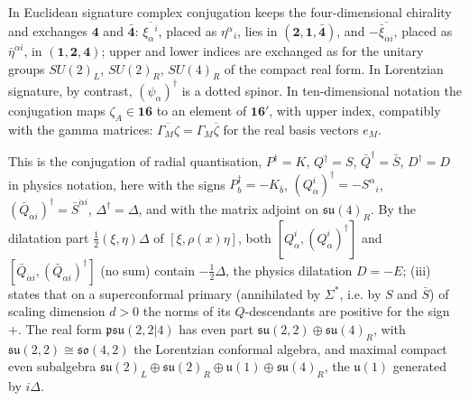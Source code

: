 \begin{remark}
In Euclidean signature complex conjugation keeps the four-dimensional chirality and exchanges $\mathbf4$ and $\bar{\mathbf4}$: $\overline{\xi_\alpha{}^i}$, placed as $\eta^\alpha{}_i$, lies in $(\mathbf2,\mathbf1,\bar{\mathbf4})$, and $-\overline{\bar\xi_{\dot\alpha i}}$, placed as $\bar\eta^{\dot\alpha i}$, in $(\mathbf1,\mathbf2,\mathbf4)$; upper and lower indices are exchanged as for the unitary groups $SU(2)_L$, $SU(2)_R$, $SU(4)_R$ of the compact real form. In Lorentzian signature, by contrast, $(\psi_\alpha)^\dagger$ is a dotted spinor. In ten-dimensional notation the conjugation maps $\zeta_A\in\mathbf{16}$ to an element of $\mathbf{16}'$, with upper index, compatibly with the gamma matrices: $\overline{\Gamma_M\zeta}=\Gamma_M\overline\zeta$ for the real basis vectors $e_M$.
\end{remark}

\begin{remark}
This is the conjugation of radial quantisation, $P^\dagger=K$, $Q^\dagger=S$, $\bar Q^\dagger=\bar S$, $D^\dagger=D$ in physics notation, here with the signs $P_b^\dagger=-K_{\bar b}$, $(Q^i_\alpha)^\dagger=-S^\alpha{}_i$, $(\bar Q_{\dot\alpha i})^\dagger=\bar S^{\dot\alpha i}$, $\Delta^\dagger=\Delta$, and with the matrix adjoint on $\mathfrak{su}(4)_R$. By the dilatation part $\tfrac12(\xi,\eta)\Delta$ of $[\xi,\rho(x)\eta]$, both $[Q^i_\alpha,(Q^i_\alpha)^\dagger]$ and $[\bar Q_{\dot\alpha i},(\bar Q_{\dot\alpha i})^\dagger]$ (no sum) contain $-\tfrac12\Delta$, the physics dilatation $D=-E$; (iii) states that on a superconformal primary (annihilated by $\Sigma^*$, i.e. by $S$ and $\bar S$) of scaling dimension $d>0$ the norms of its $Q$-descendants are positive for the sign $+$. The real form $\mathfrak{psu}(2,2|4)$ has even part $\mathfrak{su}(2,2)\oplus\mathfrak{su}(4)_R$, with $\mathfrak{su}(2,2)\cong\mathfrak{so}(4,2)$ the Lorentzian conformal algebra, and maximal compact even subalgebra $\mathfrak{su}(2)_L\oplus\mathfrak{su}(2)_R\oplus\mathfrak u(1)\oplus\mathfrak{su}(4)_R$, the $\mathfrak u(1)$ generated by $i\Delta$.
\end{remark}

